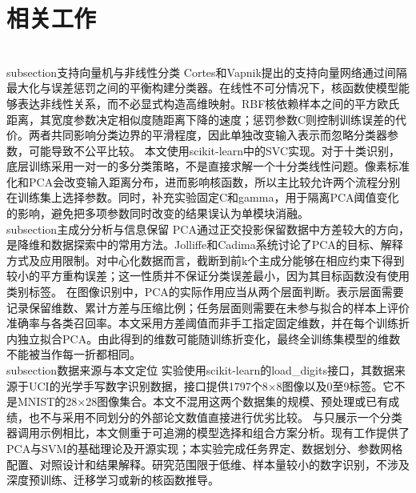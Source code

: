 \documentclass[supercite]{HustGSClassPaper}
\begin{document}
\section{相关工作}
\\subsection{支持向量机与非线性分类}
Cortes和Vapnik提出的支持向量网络通过间隔最大化与误差惩罚之间的平衡构建分类器\cite{cortes1995support}。在线性不可分情况下，核函数使模型能够表达非线性关系，而不必显式构造高维映射。RBF核依赖样本之间的平方欧氏距离，其宽度参数决定相似度随距离下降的速度；惩罚参数C则控制训练误差的代价。两者共同影响分类边界的平滑程度，因此单独改变输入表示而忽略分类器参数，可能导致不公平比较。
本文使用scikit-learn中的SVC实现\cite{pedregosa2011scikit}。对于十类识别，底层训练采用一对一的多分类策略，不是直接求解一个十分类线性问题。像素标准化和PCA会改变输入距离分布，进而影响核函数，所以主比较允许两个流程分别在训练集上选择参数。同时，补充实验固定C和gamma，用于隔离PCA阈值变化的影响，避免把多项参数同时改变的结果误认为单模块消融。
\\subsection{主成分分析与信息保留}
PCA通过正交投影保留数据中方差较大的方向，是降维和数据探索中的常用方法。Jolliffe和Cadima系统讨论了PCA的目标、解释方式及应用限制\cite{jolliffe2016principal}。对中心化数据而言，截断到前k个主成分能够在相应约束下得到较小的平方重构误差；这一性质并不保证分类误差最小，因为其目标函数没有使用类别标签。
在图像识别中，PCA的实际作用应当从两个层面判断。表示层面需要记录保留维数、累计方差与压缩比例；任务层面则需要在未参与拟合的样本上评价准确率与各类召回率。本文采用方差阈值而非手工指定固定维数，并在每个训练折内独立拟合PCA。由此得到的维数可能随训练折变化，最终全训练集模型的维数不能被当作每一折都相同。
\\subsection{数据来源与本文定位}
实验使用scikit-learn的load\_digits接口\cite{sklearn_digits}，其数据来源于UCI的光学手写数字识别数据，接口提供1797个8×8图像以及0至9标签。它不是MNIST的28×28图像集合。本文不混用这两个数据集的规模、预处理或已有成绩，也不与采用不同划分的外部论文数值直接进行优劣比较。
与只展示一个分类器调用示例相比，本文侧重于可追溯的模型选择和组合方案分析。现有工作提供了PCA与SVM的基础理论及开源实现；本实验完成任务界定、数据划分、参数网格配置、对照设计和结果解释。研究范围限于低维、样本量较小的数字识别，不涉及深度预训练、迁移学习或新的核函数推导。
\end{document}
